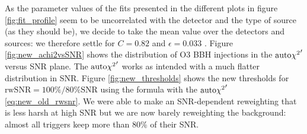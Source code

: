 As the parameter values of the fits presented in the different plots in figure \ref{fig:fit_profile} seem to be uncorrelated with the detector and the type of source (as they should be), we decide to take the mean value over the detectors and sources: we therefore settle for $C=0.82$ and $\epsilon = 0.033$ .
Figure \ref{fig:new_achi2vsSNR} shows the distribution of O3 BBH injections in the $\textrm{auto$\chi^2$}'$ versus SNR plane.
The $\textrm{auto$\chi^2$}'$ works as intended with a much flatter distribution in SNR.
Figure \ref{fig:new_thresholds} shows the new thresholds for $\text{rwSNR} = 100\%/80\% \text{SNR}$ using the formula with the $\textrm{auto$\chi^2$}'$ \ref{eq:new_old_rwsnr}.
We were able to make an SNR-dependent reweighting that is less harsh at high SNR but we are now barely reweighting the background: almost all triggers keep more than 80\% of their SNR.

